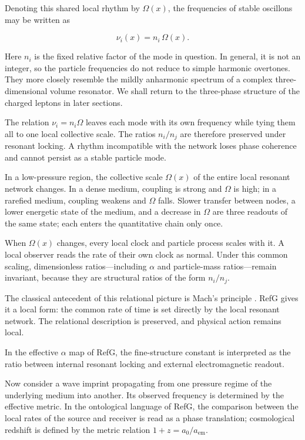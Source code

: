 \documentclass[11pt,a4paper]{article}
\begin{document}
Denoting this shared local rhythm by $\Omega(x)$, the frequencies of stable oscillons may be written as

\begin{equation}
\nu_i(x)=n_i\,\Omega(x).
\label{eq:population-locking}
\end{equation}

Here $n_i$ is the fixed relative factor of the mode in question. In general, it is not an integer, so the particle frequencies do not reduce to simple harmonic overtones. They more closely resemble the mildly anharmonic spectrum of a complex three-dimensional volume resonator. We shall return to the three-phase structure of the charged leptons in later sections.

The relation $\nu_i=n_i\Omega$ leaves each mode with its own frequency while tying them all to one local collective scale. The ratios $n_i/n_j$ are therefore preserved under resonant locking. A rhythm incompatible with the network loses phase coherence and cannot persist as a stable particle mode.

In a low-pressure region, the collective scale $\Omega(x)$ of the entire local resonant network changes. In a dense medium, coupling is strong and $\Omega$ is high; in a rarefied medium, coupling weakens and $\Omega$ falls. Slower transfer between nodes, a lower energetic state of the medium, and a decrease in $\Omega$ are three readouts of the same state; each enters the quantitative chain only once.

When $\Omega(x)$ changes, every local clock and particle process scales with it. A local observer reads the rate of their own clock as normal. Under this common scaling, dimensionless ratios---including $\alpha$ and particle-mass ratios---remain invariant, because they are structural ratios of the form $n_i/n_j$.

The classical antecedent of this relational picture is Mach's principle \citep{mach1883}. RefG gives it a local form: the common rate of time is set directly by the local resonant network. The relational description is preserved, and physical action remains local.

In the effective $\alpha$ map of RefG, the fine-structure constant is interpreted as the ratio between internal resonant locking and external electromagnetic readout.

Now consider a wave imprint propagating from one pressure regime of the underlying medium into another. Its observed frequency is determined by the effective metric. In the ontological language of RefG, the comparison between the local rates of the source and receiver is read as a phase translation; cosmological redshift is defined by the metric relation $1+z=a_0/a_{\mathrm{em}}$.
\end{document}
